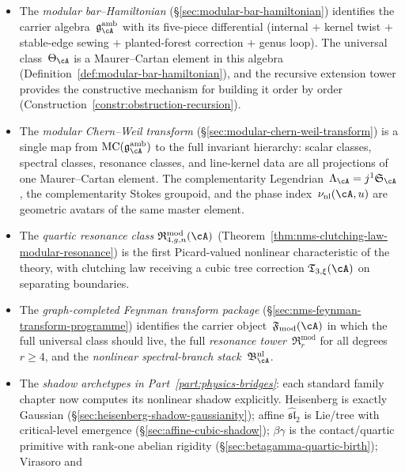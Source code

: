\begin{itemize}
 and a fake-complementarity criterion detecting when the dual
 Lagrangian is linear
 (Proposition~\ref{prop:fake-complementarity-criterion}).
\item The \emph{modular bar--Hamiltonian}
 (\S\ref{sec:modular-bar-hamiltonian}) identifies the carrier
 algebra~$\mathfrak{g}^{\mathrm{amb}}_\cA$ with its five-piece
 differential (internal $+$ kernel twist $+$ stable-edge sewing
 $+$ planted-forest correction $+$ genus loop). The universal
 class~$\Theta_\cA$ is a Maurer--Cartan element in this algebra
 (Definition~\ref{def:modular-bar-hamiltonian}), and the recursive
 extension tower provides the constructive mechanism for building
 it order by order
 (Construction~\ref{constr:obstruction-recursion}).
\item The \emph{modular Chern--Weil transform}
 (\S\ref{sec:modular-chern-weil-transform}) is a single map from
 $\operatorname{MC}(\mathfrak{g}^{\mathrm{amb}}_\cA)$ to the full
 invariant hierarchy: scalar classes, spectral classes, resonance
 classes, and line-kernel data are all projections of
 one Maurer--Cartan element. The complementarity
 Legendrian~$\Lambda_\cA = j^1\mathfrak{S}_\cA$, the
 complementarity Stokes groupoid, and the phase
 index~$\nu_{\mathrm{nl}}(\cA,u)$ are geometric avatars of the
 same master element.
\item The \emph{quartic resonance class}
 $\mathfrak{R}_{4,g,n}^{\mathrm{mod}}(\cA)$
 (Theorem~\ref{thm:nms-clutching-law-modular-resonance}) is the
 first Picard-valued nonlinear characteristic of the theory, with
 clutching law receiving a cubic tree correction
 $\mathfrak{T}_{3,\xi}(\cA)$ on separating boundaries.
\item The \emph{graph-completed Feynman transform package}
 (\S\ref{sec:nms-feynman-transform-programme}) identifies the
 carrier object~$\mathfrak{F}_{\mathrm{mod}}(\cA)$ in which the
 full universal class should live, the full
 \emph{resonance tower}~$\mathfrak{R}^{\mathrm{mod}}_{r}$ for all
 degrees~$r \ge 4$, and the \emph{nonlinear
 spectral-branch stack}~$\mathfrak{B}^{\mathrm{nl}}_\cA$.
\item The \emph{shadow archetypes in Part~\ref{part:physics-bridges}}: each standard
 family chapter now computes its nonlinear shadow explicitly.
 Heisenberg is exactly Gaussian
 (\S\ref{sec:heisenberg-shadow-gaussianity}); affine
 $\widehat{\mathfrak{sl}}_2$ is Lie/tree with critical-level
 emergence (\S\ref{sec:affine-cubic-shadow}); $\beta\gamma$ is
 the contact/quartic primitive with rank-one abelian rigidity
 (\S\ref{sec:betagamma-quartic-birth}); Virasoro and

\end{itemize}
